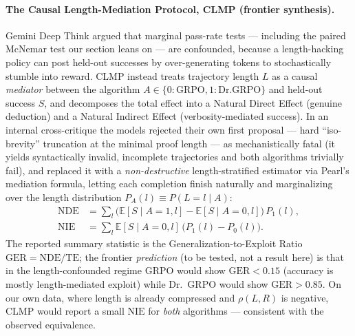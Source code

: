 \documentclass{article}
\begin{document}
\paragraph{The Causal Length-Mediation Protocol, CLMP (frontier synthesis).}
Gemini Deep Think argued that marginal pass-rate tests --- including the paired
McNemar test our section leans on --- are confounded, because a length-hacking
policy can post held-out successes by over-generating tokens to stochastically
stumble into reward. CLMP instead treats trajectory length $L$ as a causal
\emph{mediator} between the algorithm $A\in\{0{:}\mathrm{GRPO},1{:}\mathrm{Dr.GRPO}\}$
and held-out success $S$, and decomposes the total effect into a Natural Direct
Effect (genuine deduction) and a Natural Indirect Effect (verbosity-mediated
success). In an internal cross-critique the models rejected their own first
proposal --- hard ``iso-brevity'' truncation at the minimal proof length --- as
mechanistically fatal (it yields syntactically invalid, incomplete trajectories
and both algorithms trivially fail), and replaced it with a \emph{non-destructive}
length-stratified estimator via Pearl's mediation formula, letting each
completion finish naturally and marginalizing over the length distribution
$P_A(l)\equiv P(L{=}l\mid A)$:
\begin{align}
\mathrm{NDE} &= \sum_{l}\bigl(\mathbb{E}[S\mid A{=}1,l]-\mathbb{E}[S\mid A{=}0,l]\bigr)\,P_1(l),\\
\mathrm{NIE} &= \sum_{l}\mathbb{E}[S\mid A{=}0,l]\,\bigl(P_1(l)-P_0(l)\bigr).
\end{align}
The reported summary statistic is the Generalization-to-Exploit Ratio
$\mathrm{GER}=\mathrm{NDE}/\mathrm{TE}$; the frontier \emph{prediction} (to be
tested, not a result here) is that in the length-confounded regime GRPO would
show $\mathrm{GER}<0.15$ (accuracy is mostly length-mediated exploit) while
Dr.~GRPO would show $\mathrm{GER}>0.85$. On our own data, where length is already
compressed and $\rho(L,R)$ is negative, CLMP would report a small $\mathrm{NIE}$
for \emph{both} algorithms --- consistent with the observed equivalence.
\end{document}
